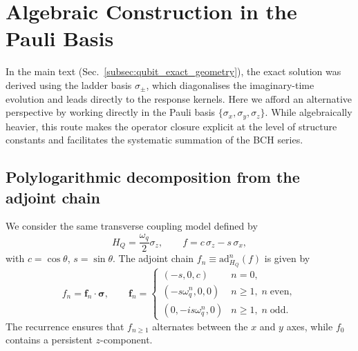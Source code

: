 ﻿%
\section{Algebraic Construction in the Pauli Basis}
\label{app:algebraic_closure_qubit}

In the main text (Sec.~\ref{subsec:qubit_exact_geometry}), the exact solution was derived using the ladder basis $\sigma_\pm$, which diagonalises the imaginary-time evolution and leads directly to the response kernels. Here we afford an alternative perspective by working directly in the Pauli basis $\{\sigma_x, \sigma_y, \sigma_z\}$. While algebraically heavier, this route makes the operator closure explicit at the level of structure constants and facilitates the systematic summation of the BCH series.

\subsection{Polylogarithmic decomposition from the adjoint chain}
\label{appalg:adjoint_chain}

We consider the same transverse coupling model defined by
\begin{equation}
    H_Q=\frac{\omega_q}{2}\sigma_z,\qquad
    f=c\,\sigma_z-s\,\sigma_x,
    \label{eq:qubit_setup_appalg}
\end{equation}
with $c=\cos\theta$, $s=\sin\theta$. The adjoint chain $f_n \equiv \mathrm{ad}_{H_Q}^n(f)$ is given by
\begin{equation}
    f_n = \mathbf{f}_n\cdot\boldsymbol{\sigma}, \qquad
    \mathbf{f}_n = \begin{cases}
        (-s,0,c) & n=0, \\
        (-s\omega_q^n,0,0) & n\ge1,\; n\;\text{even}, \\
        (0,-is\omega_q^n,0) & n\ge1,\; n\;\text{odd}.
    \end{cases}
    \label{eq:vn_qubit_appalg}
\end{equation}
The recurrence ensures that $f_{n\ge 1}$ alternates between the $x$ and $y$ axes, while $f_0$ contains a persistent $z$-component.

